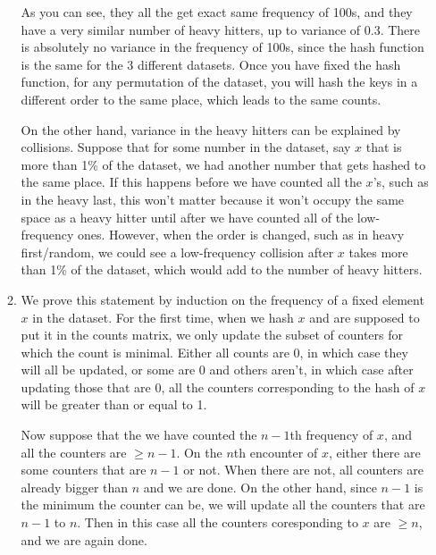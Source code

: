 \documentclass[12pt]{article}
\theoremstyle{definitionstyle}
\begin{document}
\begin{enumerate}[leftmargin=\labelsep]
\begin{enumerate}[label=(\alph*)]
            As you can see, they all the get exact same frequency of 100s, and they have a very similar number of heavy hitters, up to variance of 0.3. There is absolutely no variance in the frequency of 100s, since the hash function is the same for the 3 different datasets. Once you have fixed the hash function, for any permutation of the dataset, you will hash the keys in a different order to the same place, which leads to the same counts. 

            On the other hand, variance in the heavy hitters can be explained by collisions. Suppose that for some number in the dataset, say $x$ that is more than 1\% of the dataset, we had another number that gets hashed to the same place. If this happens before we have counted all the $x$'s, such as in the heavy last, this won't matter because it won't occupy the same space as a heavy hitter until after we have counted all of the low-frequency ones. However, when the order is changed, such as in heavy first/random, we could see a low-frequency collision after $x$ takes more than 1\% of the dataset, which would add to the number of heavy hitters.

            \item We prove this statement by induction on the frequency of a fixed element $x$ in the dataset. For the first time, when we hash $x$ and are supposed to put it in the counts matrix, we only update the subset of counters for which the count is minimal. Either all counts are 0, in which case they will all be updated, or some are 0 and others aren't, in which case after updating those that are 0, all the counters corresponding to the hash of $x$ will be greater than or equal to 1. 

            Now suppose that the we have counted the $n-1$th frequency of $x$, and all the counters are $\geq n-1$. On the $n$th encounter of $x$, either there are some counters that are $n-1$ or not. When there are not, all counters are already bigger than $n$ and we are done. On the other hand, since $n-1$ is the minimum the counter can be, we will update all the counters that are $n-1$ to $n$. Then in this case all the counters coresponding to $x$ are $\geq n$, and we are again done.


\end{enumerate}
\end{enumerate}
\end{document}
